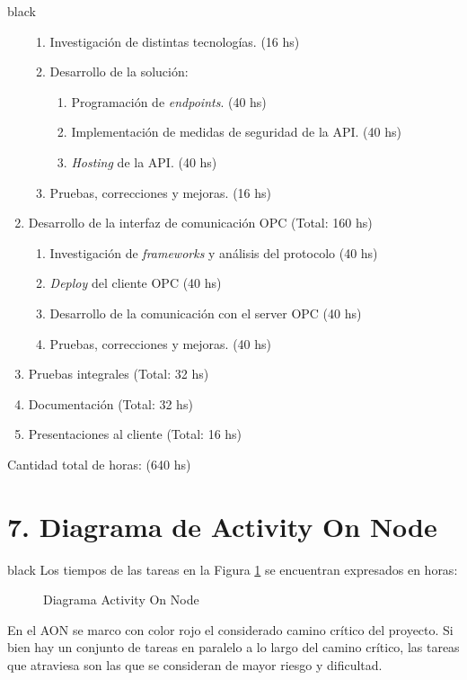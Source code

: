 \documentclass[11pt]{charter}
\begin{document}
\begin{consigna}{black}
\begin{enumerate}
	\begin{enumerate}
	\item Investigación de distintas tecnologías. (16 hs)
	\item Desarrollo de la solución:
		\begin{enumerate}
			\item Programación de \textit{endpoints}. (40 hs)
			\item Implementación de medidas de seguridad de la API. (40 hs)
			\item \textit{Hosting} de la API. (40 hs)
		\end{enumerate}
	\item Pruebas, correcciones y mejoras. (16 hs)
	\end{enumerate}
\item Desarrollo de la interfaz de comunicación OPC (Total: 160 hs)
	\begin{enumerate}
	\item Investigación de \textit{frameworks} y análisis del protocolo (40 hs)
	\item \textit{Deploy} del cliente OPC (40 hs)
	\item Desarrollo de la comunicación con el server OPC (40 hs)
	\item Pruebas, correcciones y mejoras. (40 hs)
	\end{enumerate}

\item Pruebas integrales (Total: 32 hs)

\item Documentación (Total: 32 hs)

\item Presentaciones al cliente (Total: 16 hs)
\end{enumerate}

Cantidad total de horas: (640 hs) 

\end{consigna}

\section{7. Diagrama de Activity On Node}
\label{sec:AoN}

\begin{consigna}{black}
Los tiempos de las tareas en la Figura \ref{fig:aon} se encuentran expresados en horas:

\begin{figure}[H]
    \centering
    \def\svgwidth{\columnwidth}  
    \fontsize{7}{5}\selectfont
    
	\caption{Diagrama Activity On Node}
	\label{fig:aon}
\end{figure}

En el AON se marco con color rojo el considerado camino crítico del proyecto. Si bien hay un conjunto de tareas en paralelo a lo largo del camino crítico, las tareas que atraviesa son las que se consideran de mayor riesgo y dificultad. 

\end{consigna}
\end{document}
